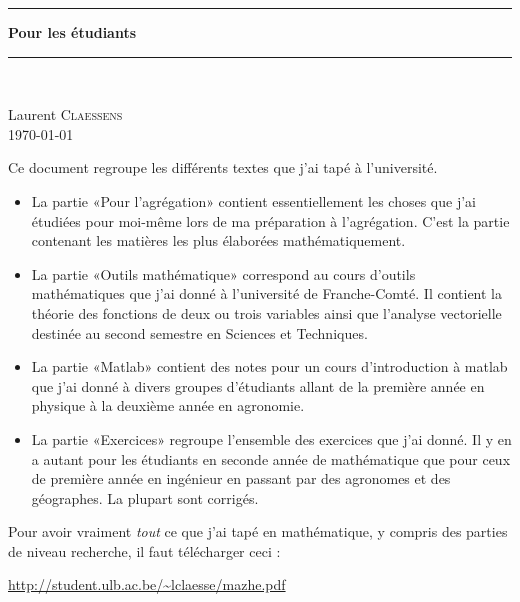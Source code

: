 
\thispagestyle{empty}
\begin{center}
  \begin{minipage}{15cm}
    \hrule\par
    \vspace{2mm}
    \begin{center}
    \Huge \bfseries  Pour les étudiants \par
    \end{center}
    \hrule\par
  \end{minipage}\\
\end{center}

\vspace{2cm}

\begin{center}
    Laurent \textsc{Claessens}\\
    \today
\end{center}

\vfill

\LogoEtLicence

\clearpage

\thispagestyle{empty}

Ce document regroupe les différents textes que j'ai tapé à l'université.
\begin{itemize}
    \item La partie «Pour l'agrégation» contient essentiellement les choses que j'ai étudiées pour moi-même lors de ma préparation à l'agrégation. C'est la partie contenant les matières les plus élaborées mathématiquement.
    \item La partie «Outils mathématique» correspond au cours d'outils mathématiques que j'ai donné à l'université de Franche-Comté. Il contient la théorie des fonctions de deux ou trois variables ainsi que l'analyse vectorielle destinée au second semestre en Sciences et Techniques.
    \item La partie «Matlab» contient des notes pour un cours d'introduction à matlab que j'ai donné à divers groupes d'étudiants allant de la première année en physique à la deuxième année en agronomie.
    \item La partie «Exercices» regroupe l'ensemble des exercices que j'ai donné. Il y en a autant pour les étudiants en seconde année de mathématique que pour ceux de première année en ingénieur en passant par des agronomes et des géographes. La plupart sont corrigés.
\end{itemize}

\vfill

Pour avoir vraiment \emph{tout} ce que j'ai tapé en mathématique, y compris des parties de niveau recherche, il faut télécharger ceci :
        \begin{center}
        \url{http://student.ulb.ac.be/~lclaesse/mazhe.pdf}
        \end{center}



\clearpage
